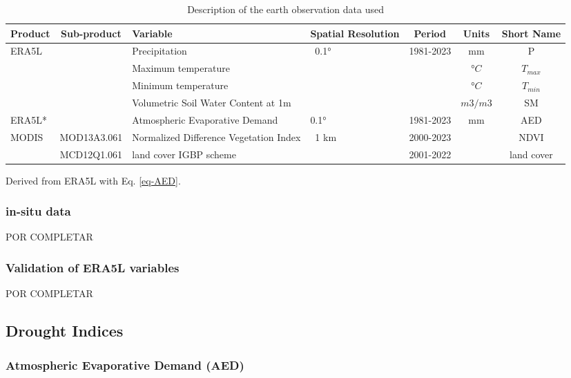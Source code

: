 \documentclass[
  authoryear,
  preprint,
  3p,
  onecolumn]{elsarticle}
\begin{document}
\begin{table}[!ht]
\caption{Description of the earth observation data used }
\label{tab-desEOD}
\small
\centering
\begin{tabular}{p{}cp{}p{}ccc}
\hline
\multirow{1}{*}{\centering Product} & Sub-product & Variable & Spatial Resolution  & Period & Units & Short Name \\ 
\hline
\multirow{4}{*}{ERA5L} & ~ & Precipitation & \multirow{4}{*}{~0.1°} & \multirow{4}{*}{1981-2023} & mm & P \\ 
         &  & Maximum temperature & ~ & & $°C$ & $T_{max}$ \\ 
         &  & Minimum temperature & ~ & & $°C$ & $T_{min}$ \\ 
         &  & Volumetric Soil Water Content at 1m & ~ & & $m3/m3$ & SM \\ 
ERA5L* & & Atmospheric Evaporative Demand & 0.1° & 1981-2023 & mm & AED \\
        \multirow{2}{*}{MODIS} & MOD13A3.061 & Normalized Difference Vegetation Index & \multirow{2}{*}{~1 km} & 2000-2023 & ~ & NDVI \\ 
         & MCD12Q1.061 & land cover IGBP scheme & & 2001-2022 & ~ & land cover \\ 
\hline
\end{tabular}
{\raggedright *Derived from ERA5L with Eq. \ref{eq-AED}. \par}
\end{table}

\hypertarget{in-situ-data}{%
\subsubsection{in-situ data}\label{in-situ-data}}

POR COMPLETAR

\hypertarget{validation-of-era5l-variables}{%
\subsubsection{Validation of ERA5L
variables}\label{validation-of-era5l-variables}}

POR COMPLETAR

\hypertarget{drought-indices}{%
\subsection{Drought Indices}\label{drought-indices}}

\hypertarget{atmospheric-evaporative-demand-aed}{%
\subsubsection{Atmospheric Evaporative Demand
(AED)}\label{atmospheric-evaporative-demand-aed}}
\end{document}
